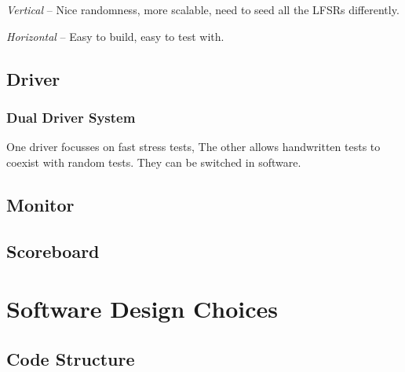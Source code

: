 \textit{Vertical} --
Nice randomness, more scalable, need to seed all the LFSRs differently.

\textit{Horizontal} --
Easy to build, easy to test with.

\subsection{Driver}
\subsubsection{Dual Driver System}
One driver focusses on fast stress tests,
The other allows handwritten tests to coexist with random tests.
They can be switched in software.

\subsection{Monitor}


\subsection{Scoreboard}

\section{Software Design Choices}

\subsection{Code Structure}
